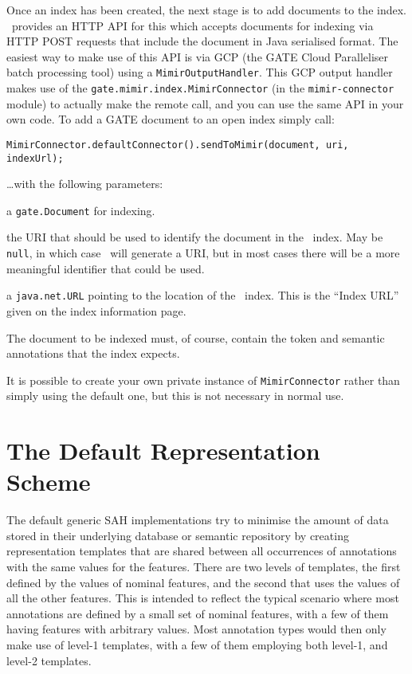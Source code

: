 Once an index has been created, the next stage is to add documents to the
index.  \Mimir\ provides an HTTP API for this which accepts documents for
indexing via HTTP POST requests that include the document in Java serialised
format.  The easiest way to make use of this API is via GCP (the GATE Cloud
Paralleliser batch processing tool) using a \lstinline!MimirOutputHandler!.
This GCP output handler makes use of the
\lstinline!gate.mimir.index.MimirConnector! (in the {\tt mimir-connector} module)
to actually make the remote call, and you can use the same API in your own
code.  To add a GATE document to an open index simply call:
\begin{lstlisting}[breaklines]
MimirConnector.defaultConnector().sendToMimir(document, uri, indexUrl);
\end{lstlisting}
%
\ldots{}with the following parameters:
\bde
\item[document] a \lstinline!gate.Document! for indexing.
\item[uri] the URI that should be used to identify the document in the \Mimir\
  index.  May be \lstinline!null!, in which case \Mimir\ will generate a URI,
  but in most cases there will be a more meaningful identifier that could be
  used.
\item[indexUrl] a \lstinline!java.net.URL! pointing to the location of the
  \Mimir\ index.  This is the ``Index URL'' given on the index information page.
\ede

The document to be indexed must, of course, contain the token and semantic
annotations that the index expects.

It is possible to create your own private instance of
\lstinline!MimirConnector! rather than simply using the default one, but this
is not necessary in normal use.

\section{The Default Representation Scheme}\label{sec:indexing:dsah-detail}

The default generic SAH implementations try to minimise the amount of data
stored in their underlying database or semantic repository by creating
representation templates that are shared between all occurrences of annotations
with the same values for the features. There are two levels of templates, the
first defined by the values of nominal features, and the second that uses the
values of all the other features. This is intended to reflect the typical
scenario where most annotations are defined by a small set of nominal features,
with a few of them having features with arbitrary values. Most annotation types
would then only make use of level-1 templates, with a few of them employing both
level-1, and level-2 templates.

